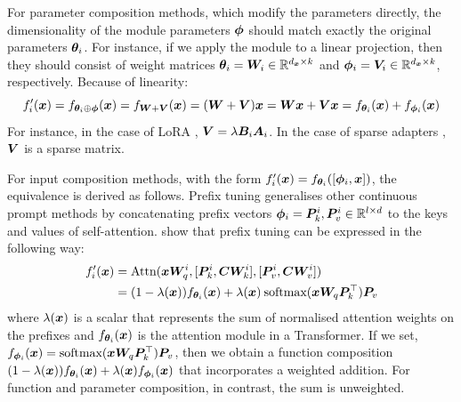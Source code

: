 \documentclass[10pt]{article} %
\begin{document}
For parameter composition methods, which modify the parameters directly,  the dimensionality of the module parameters ${\bm{\phi}}$ should match exactly the original parameters ${\bm{\theta}}_i$. For instance, if we apply the module to a linear projection, then they should consist of weight matrices ${\bm{\theta}}_i = {\bm{W}}_i \in \mathbb{R}^{d_{\bm{x}} \times k}$ and ${\bm{\phi}}_i = {\bm{V}}_i \in \mathbb{R}^{d_{\bm{x}} \times k}$, respectively. Because of linearity:
\begin{equation*}
f_i^\prime({\bm{x}}) = f_{{\bm{\theta}}_i \oplus {\bm{\phi}}}({\bm{x}}) = f_{{\bm{W}} + {\bm{V}}} ({\bm{x}}) = ({\bm{W}} + {\bm{V}}) {\bm{x}} =  {\bm{W}} {\bm{x}} + {\bm{V}} {\bm{x}} = f_{{\bm{\theta}}_i}({\bm{x}}) + f_{{\bm{\phi}}_i}({\bm{x}})
\end{equation*}
For instance, in the case of LoRA \citep{hu2021lora}, ${\bm{V}} = \lambda {\bm{B}}_i {\bm{A}}_i$. In the case of sparse adapters \citep{ansell2021composable}, ${\bm{V}}$ is a sparse matrix. 

For input composition methods, with the form $f_i^\prime({\bm{x}}) = f_{{\bm{\theta}}_i}([{\bm{\phi}}_i, {\bm{x}}])$, the equivalence is derived as follows. Prefix tuning \citep{Li2020PrefixTuning} generalises other continuous prompt methods by concatenating prefix vectors ${\bm{\phi}}_i = {\bm{P}}_k^i, {\bm{P}}_v^i \in \mathbb{R}^{l \times d}$ to the keys and values of self-attention. \citet{He2021UnifiedAdapters} show that prefix tuning can be expressed in the following way:
\begin{align*}
f_i^\prime({\bm{x}}) & = \text{Attn}({\bm{x}} {\bm{W}}_q^i, [{\bm{P}}_k^i, {\bm{C}} {\bm{W}}_k^i], [{\bm{P}}_v^i, {\bm{C}} {\bm{W}}_v^i]) \\
& = (1-\lambda({\bm{x}})) f_{{\bm{\theta}}_i}({\bm{x}}) + \lambda({\bm{x}}) \: \text{softmax}({\bm{x}} {\bm{W}}_q {\bm{P}}_k^\top) {\bm{P}}_v
\end{align*}
where $\lambda({\bm{x}})$ is a scalar that represents the sum of normalised attention weights on the prefixes and $f_{{\bm{\theta}}_i}({\bm{x}})$ is the attention module in a Transformer. If we set, $f_{{\bm{\phi}}_i}({\bm{x}}) = \text{softmax}({\bm{x}} {\bm{W}}_q {\bm{P}}_k^\top) {\bm{P}}_v$, then we obtain a function composition $(1-\lambda({\bm{x}})) f_{{\bm{\theta}}_i}({\bm{x}}) + \lambda({\bm{x}}) f_{{\bm{\phi}}_i}({\bm{x}})$ that incorporates a weighted addition. For function and parameter composition, in contrast, the sum is unweighted.
\end{document}

